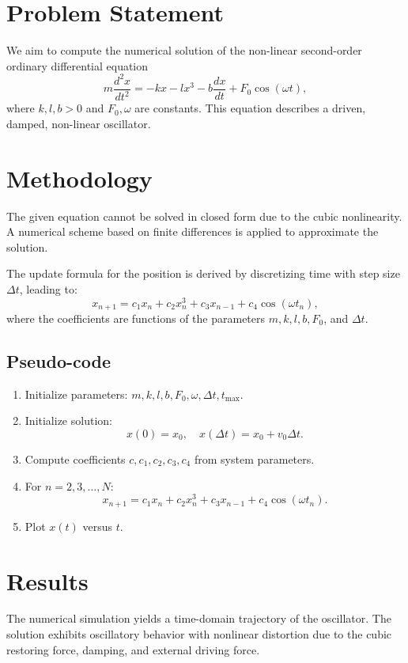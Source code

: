 \section*{Problem Statement}
We aim to compute the numerical solution of the non-linear second-order ordinary differential equation
\[
    m \frac{d^2x}{dt^2} = -kx - lx^3 - b\frac{dx}{dt} + F_0 \cos(\omega t),
\]
where $k, l, b > 0$ and $F_0, \omega$ are constants. This equation describes a driven, damped, non-linear oscillator.

\section*{Methodology}
The given equation cannot be solved in closed form due to the cubic nonlinearity. A numerical scheme based on finite differences is applied to approximate the solution.

The update formula for the position is derived by discretizing time with step size $\Delta t$, leading to:
\[
    x_{n+1} = c_1 x_n + c_2 x_n^3 + c_3 x_{n-1} + c_4 \cos(\omega t_n),
\]
where the coefficients are functions of the parameters $m, k, l, b, F_0$, and $\Delta t$.

\subsection*{Pseudo-code}
\begin{enumerate}
    \item Initialize parameters: $m, k, l, b, F_0, \omega, \Delta t, t_{\max}$.
    \item Initialize solution:
    \[
        x(0) = x_0, \quad x(\Delta t) = x_0 + v_0 \Delta t.
    \]
    \item Compute coefficients $c, c_1, c_2, c_3, c_4$ from system parameters.
    \item For $n = 2,3,\dots,N$:
    \[
        x_{n+1} = c_1 x_n + c_2 x_n^3 + c_3 x_{n-1} + c_4 \cos(\omega t_n).
    \]
    \item Plot $x(t)$ versus $t$.
\end{enumerate}

\section*{Results}
The numerical simulation yields a time-domain trajectory of the oscillator. The solution exhibits oscillatory behavior with nonlinear distortion due to the cubic restoring force, damping, and external driving force.


